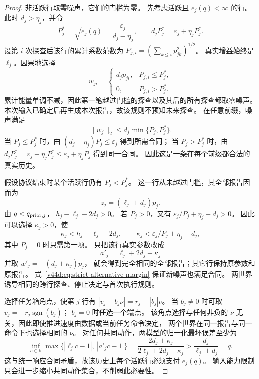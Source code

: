 \documentclass[11pt,a4paper]{article}
\numberwithin{equation}{section}
\theoremstyle{definition}
\begin{document}
\begin{proof}
非活跃行取零噪声，它们的门槛为零。
先考虑活跃且 $e_j(q)<\infty$ 的行。此时
$d_j>\eta_j$，并令
\begin{equation}
 P_j^*=\sqrt{e_j(q)}=\frac{\varepsilon_j}{d_j-\eta_j},
 \qquad d_jP_j^*=\varepsilon_j+\eta_jP_j^*.
 \label{v44d:eq:row-threshold}
\end{equation}
设第 $i$ 次探查后该行的累计系数范数为
$P_{j,i}=(\sum_{k\le i}p_{jk}^2)^{1/2}$。
真实增益始终是 $\ell_j$。因果地选择
\begin{equation}
 w_{ji}=
 \begin{cases}
 d_jp_{ji},&P_{j,i}\le P_j^*,\\
 0,&P_{j,i}>P_j^*.
 \end{cases}
 \label{v44d:eq:threshold-adversary}
\end{equation}
累计能量单调不减，因此第一笔越过门槛的探查以及其后的所有探查都取零噪声。
本次输入已确定后再生成本次报告，故该规则不预知未来探查。
在任意前缀，噪声满足
\[
 \|w_j\|_2\le d_j\min\{P_j,P_j^*\}.
\]
当 $P_j\le P_j^*$ 时，由
$(d_j-\eta_j)P_j\le\varepsilon_j$ 得到所需合同；
当 $P_j>P_j^*$ 时，由
$d_jP_j^*=\varepsilon_j+\eta_jP_j^*
 \le\varepsilon_j+\eta_jP_j$ 得到同一合同。
因此这是一条在每个前缀都合法的真实历史。

假设协议结束时某个活跃行仍有 $P_j<P_j^*$。
这一行从未越过门槛，其全部报告因而为
\begin{equation}
 z_j=(\ell_j+d_j)p_j.
 \label{v44d:eq:unsaturated-midpoint-data}
\end{equation}
由 $q<q_{{\rm prior},j}$，
$h_j-\ell_j-2d_j>0$。
若 $P_j>0$，又有
$\varepsilon_j/P_j+\eta_j-d_j>0$。
因此可以选择 $\kappa_j>0$，使
\begin{equation}
 \kappa_j<h_j-\ell_j-2d_j,\qquad
 \kappa_j<\varepsilon_j/P_j+\eta_j-d_j,
 \label{v44d:eq:strict-alternative-margin}
\end{equation}
其中 $P_j=0$ 时只需第一项。
只把该行真实参数改成
\begin{equation}
 a'_j=\ell_j+2d_j+\kappa_j
 \label{v44d:eq:strict-alternative-gain}
\end{equation}
并取 $w'_j=-(d_j+\kappa_j)p_j$，
就会得到完全相同的全部报告；其它行保持原参数和原报告。
式~\eqref{v44d:eq:strict-alternative-margin} 保证新噪声也满足合同。
两世界诱导相同的跨行探查、停止决定与首次执行规则。

选择任务箱角点，使第 $j$ 行有
$|v_j-b_j\nu|=r_j+|b_j|\nu$。
当 $b_j\ne0$ 时可取 $v_j=-r_j\operatorname{sgn}(b_j)$；
$b_j=0$ 时任选一个端点。
该角点选择与任何非负的 $\nu$ 无关，因此即使推进速度由数据或当前任务命令决定，
两个世界在同一报告与同一命令下也选择相同的 $\nu$。
对任何共同动作，两模型的归一化最坏误差至少为
\begin{equation}
 \inf_{c\in\mathbb R}
 \max\{|\ell_jc-1|,\ |a'_jc-1|\}
 =\frac{2d_j+\kappa_j}{2\ell_j+2d_j+\kappa_j}
 >\frac{d_j}{\ell_j+d_j}=q.
 \label{v44d:eq:strict-pair-lower}
\end{equation}
这与统一响应合同矛盾，故该历史上每个活跃行必须支付 $e_j(q)$。
输入能力限制只会进一步缩小共同动作集合，不削弱此必要性。


\end{proof}
\end{document}
